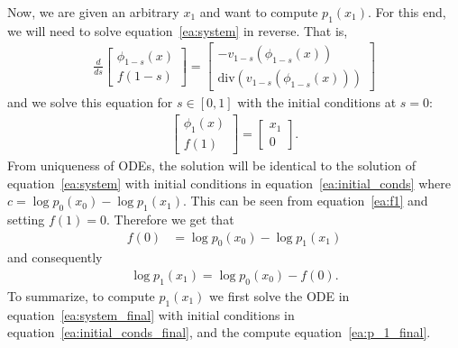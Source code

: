 \documentclass{article}
\newcommand{\divv}{\mathrm{div}} %
\def\eqref#1{equation~\ref{#1}}
\begin{document}
Now, we are given an arbitrary $x_1$ and want to compute $p_1(x_1)$. For this end, we will need to solve \eqref{ea:system} in reverse. That is,
\begin{align}\label{ea:system_final}
    \frac{d}{ds}\begin{bmatrix}
    \phi_{1-s}(x) \\
    f(1-s) 
    \end{bmatrix}=
    \begin{bmatrix}
    -v_{1-s}(\phi_{1-s}(x)) \\ 
    \divv (v_{1-s}(\phi_{1-s}(x)))
    \end{bmatrix}
\end{align}
and we solve this equation for $s\in [0,1]$ with the initial conditions at $s=0$:
\begin{align}\label{ea:initial_conds_final}
    \begin{bmatrix}
    \phi_1(x) \\ 
    f(1)
    \end{bmatrix} = \begin{bmatrix}
    x_1 \\ 0
    \end{bmatrix}.
\end{align}
From uniqueness of ODEs, the solution will be identical to the solution of \eqref{ea:system} with initial conditions in \eqref{ea:initial_conds} where $c=\log p_0(x_0)-\log p_1(x_1)$. This can be seen from \eqref{ea:f1} and setting $f(1)=0$. Therefore we get that 
\begin{align*}
    f(0) &= \log p_0(x_0)-\log p_1(x_1)
\end{align*}
and consequently 
\begin{align}\label{ea:p_1_final}
    \log p_1(x_1) = \log p_0(x_0) - f(0).
\end{align}
To summarize, to compute $p_1(x_1)$ we first solve the ODE in \eqref{ea:system_final} with initial conditions in \eqref{ea:initial_conds_final}, and the compute \eqref{ea:p_1_final}. 
\end{document}
